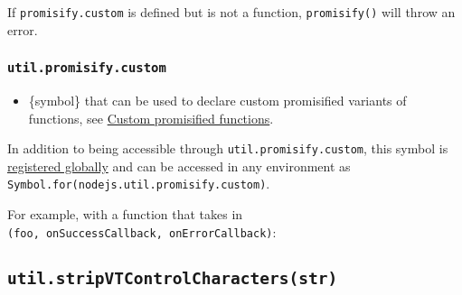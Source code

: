 If \texttt{promisify.custom} is defined but is not a function,
\texttt{promisify()} will throw an error.

\subsubsection{\texorpdfstring{\texttt{util.promisify.custom}}{util.promisify.custom}}\label{util.promisify.custom}

\begin{itemize}
\tightlist
\item
  \{symbol\} that can be used to declare custom promisified variants of
  functions, see \hyperref[custom-promisified-functions]{Custom
  promisified functions}.
\end{itemize}

In addition to being accessible through \texttt{util.promisify.custom},
this symbol is
\href{https://developer.mozilla.org/en-US/docs/Web/JavaScript/Reference/Global_Objects/Symbol/for}{registered
globally} and can be accessed in any environment as
\texttt{Symbol.for(\textquotesingle{}nodejs.util.promisify.custom\textquotesingle{})}.

For example, with a function that takes in
\texttt{(foo,\ onSuccessCallback,\ onErrorCallback)}:

\begin{Shaded}
\begin{Highlighting}[]
\OperatorTok{=} \NormalTok{(}\NormalTok{)}\OperatorTok{;}

\OperatorTok{=}\KeywordTok{=\textgreater{}}\NormalTok{ \{}
    \OperatorTok{,}\KeywordTok{=\textgreater{}}\NormalTok{ \{}
    \OperatorTok{,}\OperatorTok{,}\OperatorTok{;}
\NormalTok{  \})}\OperatorTok{;}
\NormalTok{\}}\OperatorTok{;}
\end{Highlighting}
\end{Shaded}

\subsection{\texorpdfstring{\texttt{util.stripVTControlCharacters(str)}}{util.stripVTControlCharacters(str)}}\label{util.stripvtcontrolcharactersstr}

